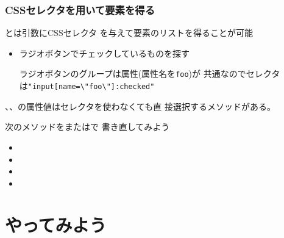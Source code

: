 \begin{frame}[containsverbatim]
 \frametitle{CSSセレクタを用いて要素を得る}
 とは引数にCSSセレクタ
 を与えて要素のリストを得ることが可能
 \begin{itemize}
  \item ラジオボタンでチェックしているものを探す

        ラジオボタンのグループは属性(属性名を\texttt{foo})が
        共通なのでセレクタは\Verb+"input[name=\"foo\"]:checked"+
 \end{itemize}
 、、の属性値はセレクタを使わなくても直
 接選択するメソッドがある。

 次のメソッドをまたはで
 書き直してみよう
\begin{itemize}
  \item {}
  \item {}
  \item {}
  \item {}
 \end{itemize}
\end{frame}

 \section{やってみよう}
\begin{frame}[containsverbatim]
\end{frame}

\begin{frame}[containsverbatim]
 \frametitle{}
\end{frame}
